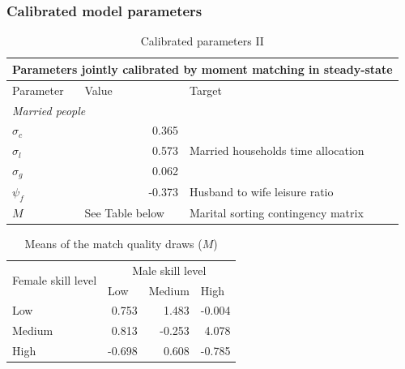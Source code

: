 \documentclass{beamer}
\begin{document}
\begin{frame}
	\frametitle{Calibrated model parameters}
	\tiny
		\begin{table}[htbp]
		\centering
		\caption{Calibrated parameters II}
		\begin{tabular}{lll}
			\toprule
			\multicolumn{3}{c}{Parameters jointly calibrated by moment matching in steady-state} \\
			\midrule
			Parameter & Value & Target \\
			\midrule
			\multicolumn{2}{l}{\textit{Married people}} &  \\
			$\sigma_c$ & \multicolumn{1}{r}{0.365} &  \\
			$\sigma_l$ & \multicolumn{1}{r}{0.573} & \multicolumn{1}{p{20.68em}}{Married households time allocation} \\
			$\sigma_g$ & \multicolumn{1}{r}{0.062} &  \\
			$\psi_f$ & \multicolumn{1}{r}{-0.373} & Husband to wife leisure ratio \\
			$M$ & See Table below & Marital sorting contingency matrix \\
			\bottomrule
			\bottomrule
		\end{tabular}
	\end{table}
	\begin{table}[]
	\centering
	\caption{Means of the match quality draws ($M$)}
	\begin{tabular}{lrrr}
		\toprule
		\multicolumn{1}{c}{\multirow{2}[4]{*}{Female skill level}} & \multicolumn{3}{c}{Male skill level} \\
		\cmidrule{2-4}          & \multicolumn{1}{l}{Low} & \multicolumn{1}{l}{Medium} & \multicolumn{1}{l}{High} \\
		\midrule
		Low   & 0.753 & 1.483 & -0.004 \\
		Medium & 0.813 & -0.253 & 4.078 \\
		High  & -0.698 & 0.608 & -0.785 \\
		\bottomrule
		\bottomrule
	\end{tabular}
	\end{table}
\end{frame}
\end{document}
